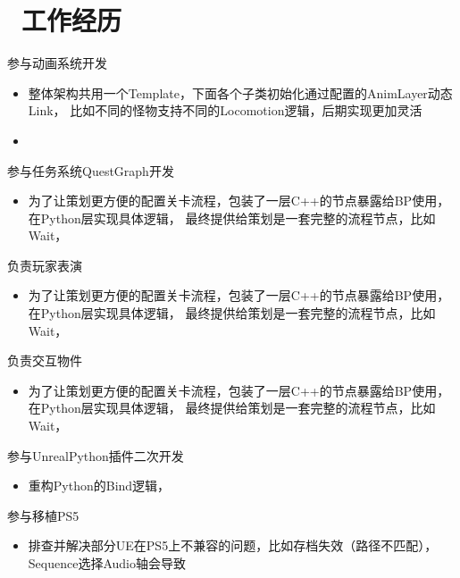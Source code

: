 \documentclass{resume}
\begin{document}
\section{\faUsers\ 工作经历}
参与动画系统开发
\begin{itemize}
  \item 整体架构共用一个Template，下面各个子类初始化通过配置的AnimLayer动态Link，
  比如不同的怪物支持不同的Locomotion逻辑，后期实现更加灵活
  \item 
\end{itemize}
\begin{onehalfspacing}
参与任务系统QuestGraph开发
\begin{itemize}
  \item 为了让策划更方便的配置关卡流程，包装了一层C++的节点暴露给BP使用，在Python层实现具体逻辑，
  最终提供给策划是一套完整的流程节点，比如Wait，
\end{itemize}
\end{onehalfspacing}
\begin{onehalfspacing}
负责玩家表演
\begin{itemize}
  \item 为了让策划更方便的配置关卡流程，包装了一层C++的节点暴露给BP使用，在Python层实现具体逻辑，
  最终提供给策划是一套完整的流程节点，比如Wait，
\end{itemize}
\end{onehalfspacing}
\begin{onehalfspacing}
负责交互物件
\begin{itemize}
  \item 为了让策划更方便的配置关卡流程，包装了一层C++的节点暴露给BP使用，在Python层实现具体逻辑，
  最终提供给策划是一套完整的流程节点，比如Wait，
\end{itemize}
\end{onehalfspacing}
\begin{onehalfspacing}
参与UnrealPython插件二次开发
\begin{itemize}
  \item 重构Python的Bind逻辑，
\end{itemize}
\end{onehalfspacing}
\begin{onehalfspacing}
参与移植PS5
\begin{itemize}
  \item 排查并解决部分UE在PS5上不兼容的问题，比如存档失效（路径不匹配），Sequence选择Audio轴会导致
\end{itemize}
\end{onehalfspacing}
\end{document}
